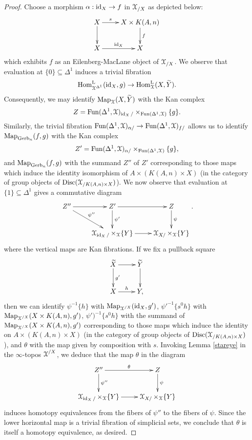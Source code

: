 \begin{proof}
Choose a morphism $\alpha: \operatorname{id}_{X} \rightarrow f$ in $\operatorname{\mathcal{X}}_{/X}$ as depicted below:
$$ \xymatrix{ X \ar[d] \ar[r]^-{s} & X \times K(A,n) \ar[d]^-{f} \\
X \ar[r]^-{\id_{X} } & X }$$
which exhibits $f$ as an Eilenberg-MacLane object of $\operatorname{\mathcal{X}}_{/X}$. We observe that
evaluation at $\{0\} \subseteq \Delta^1$ induces a trivial fibration
$$ \operatorname{Hom}^{\operatorname{L}}_{\operatorname{\mathcal{X}}^{\Delta^1}}( \operatorname{id}_{X}, g) \rightarrow \operatorname{Hom}^{\operatorname{L}}_{\operatorname{\mathcal{X}}}(X, \widetilde{Y}).$$
Consequently, we may identify $\operatorname{{Map}}_{\operatorname{\mathcal{X}}}(X, \widetilde{Y})$ with the Kan complex
$$ Z = \operatorname{Fun}(\Delta^1,\operatorname{\mathcal{X}})_{\operatorname{id}_{X}/} \times_{ \operatorname{Fun}(\Delta^1,\operatorname{\mathcal{X}}) } \{ g \}. $$
Similarly, the trivial fibration $\operatorname{Fun}(\Delta^1,\operatorname{\mathcal{X}})_{\alpha/} \rightarrow \operatorname{Fun}(\Delta^1,\operatorname{\mathcal{X}})_{f/}$
allows us to identify $\operatorname{{Map}}_{\operatorname{Gerb}_n}(f,g)$ with the Kan complex
$$Z' = \operatorname{Fun}(\Delta^1,\operatorname{\mathcal{X}})_{\alpha/} \times_{\operatorname{Fun}(\Delta^1,\operatorname{\mathcal{X}}) } \{ g\},$$
and $\operatorname{{Map}}_{\operatorname{Gerb}_n}(f,g)$ with the summand $Z''$ of $Z'$ corresponding to those maps
which induce the identity isomorphism of $A \times (K(A,n) \times X)$ (in the category of group
objects of $\operatorname{Disc}( \operatorname{\mathcal{X}}_{/ K(A,n) \times X})$). We now observe that evaluation at
$\{1\} \subseteq \Delta^1$ gives a commutative diagram
$$ \xymatrix{ Z'' \ar[r] \ar[dr]^-{\psi''} & Z' \ar[d]^-{\psi'} \ar[r] & Z \ar[d]^-{\psi} \\
& \calX_{\id_{X}/} \times_{\calX} \{Y \} \ar[r] & \calX_{X/} \times_{\calX} \{Y\} }.$$
where the vertical maps are Kan fibrations. If we fix a pullback square
$$ \xymatrix{ \widetilde{X} \ar[r] \ar[d]^-{g'} & \widetilde{Y} \ar[d] \\
X \ar[r]^-{h} & Y,} $$
then we can identify $\psi^{-1} \{h\}$ with $\operatorname{{Map}}_{\operatorname{\mathcal{X}}^{/X}}( \operatorname{id}_{X}, g')$,
${\psi'}^{-1} \{ s^0 h \}$ with $\operatorname{{Map}}_{\operatorname{\mathcal{X}}^{/X}}( X \times K(A,n), g')$, 
${\psi'})^{-1} \{ s^0 h\}$ with the summand of $\operatorname{{Map}}_{\operatorname{\mathcal{X}}^{/X}}( X \times K(A,n), g')$
corresponding to those maps which induce the identity on $A \times (K(A,n) \times X)$ (in the category of group objects of $\operatorname{Disc}( \operatorname{\mathcal{X}}_{/ K(A,n) \times X})$), and $\theta$ with
the map given by composition with $s$. Invoking Lemma \ref{stareye} in the $\infty$-topos
$\operatorname{\mathcal{X}}^{/X}$, we deduce that the map $\theta$ in the diagram
$$ \xymatrix{
Z'' \ar[r]^-{\theta} \ar[d]^-{\psi''} & Z \ar[d]^-{\psi} \\
 \calX_{\id_{X}/} \times_{\calX} \{Y \} \ar[r] & \calX_{X/} \times_{\calX} \{Y\} }$$
induces homotopy equivalences from the fibers of $\psi''$ to the fibers of $\psi$. Since the 
lower horizontal map is a trivial fibration of simplicial sets, we conclude that $\theta$ is itself a homotopy equivalence, as desired.
\end{proof}

